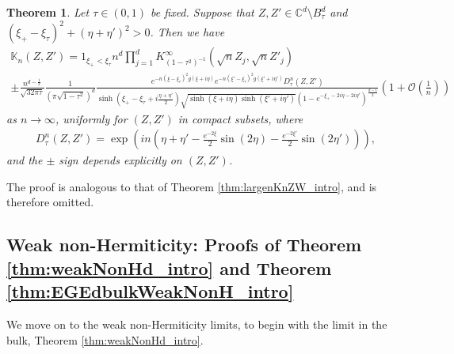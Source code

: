 \documentclass[%
 jmp,
cp,  %
 amsmath,amsthm,amssymb,%
 reprint,%
onecolumn]{revtex4-2}
\newtheorem{theorem}{Theorem}[section]
\begin{document}
\begin{theorem}
Let $\tau\in (0,1)$ be fixed. Suppose that $Z,Z'\in \mathbb C^d\setminus B_\tau^d$ and $(\xi_+-\xi_\tau)^2+(\eta+\eta')^2>0$. Then we have
\begin{multline*} 
\mathbb K_n(Z, Z') = \mathfrak{1}_{\xi_+<\xi_\tau} n^d \prod_{j=1}^d K_{(1-\tau^2)^{-1}}^{\infty}\left(\sqrt n Z_j, \sqrt n Z'_j\right)\\
\pm  \frac{n^{d-\frac{1}{2}}}{\sqrt{32\pi\tau}} \frac{1}{(\pi\sqrt{1-\tau^2})^d} 
\frac{\displaystyle e^{- n (\xi-\xi_\tau)^2 g(\xi+i\eta)} e^{- n (\xi'-\xi_\tau)^2 g(\xi'+i\eta')} D_{\tau}^{n}(Z,Z') }{\sinh\left(\xi_+-\xi_\tau + i \frac{\eta+\eta'}{2}\right) \sqrt{\sinh\left(\xi+i\eta\right) \sinh\left(\xi'+i\eta'\right)} \left(1-e^{-\xi_+-2i\eta-2i\eta'}\right)^\frac{d-1}{2} } 
\left(1+ \mathcal O\left(\frac{1}{n}\right)\right)
\end{multline*} 
as $n\to\infty$, uniformly for $(Z,Z')$ in compact subsets, where
\begin{align*}
D_{\tau}^n(Z,Z')= \exp\left(i n (\eta+\eta' - \frac{e^{-2\xi}}{2} \sin(2\eta)-\frac{e^{-2\xi'}}{2} \sin(2\eta'))\right),
\end{align*}
and the $\pm$ sign depends explicitly on $(Z,Z')$. 
\end{theorem}

The proof is analogous to that of Theorem \ref{thm:largenKnZW_intro}, and is therefore omitted.

\subsection{Weak non-Hermiticity: Proofs of Theorem \ref{thm:weakNonHd_intro} and Theorem \ref{thm:EGEdbulkWeakNonH_intro}}
We move on to the weak non-Hermiticity limits, to begin with the limit in the bulk, Theorem \ref{thm:weakNonHd_intro}.\\
\end{document}
